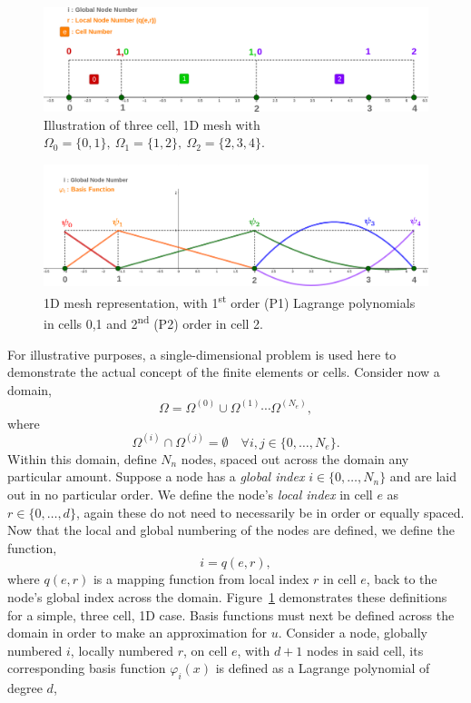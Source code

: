 \begin{figure}
	\centering
	\includegraphics[width=0.8\linewidth]{Figures/node_numbers}
	\caption{Illustration of three cell, 1D mesh with $\Omega_0 = \{0,1\},~\Omega_1 = \{1,2\},~\Omega_2 = \{2,3,4\}$.}
	\label{fig:cells}
\end{figure}
\begin{figure}
	\centering
	\includegraphics[width=0.8\linewidth]{Figures/basis_funcs}
	\caption{1D mesh representation, with 1\textsuperscript{st} order (P1) Lagrange polynomials in cells 0,1 and 2\textsuperscript{nd} (P2) order in cell 2.}
	\label{fig:1dbasis}
\end{figure}
For illustrative purposes, a single-dimensional problem is used here to demonstrate the actual concept of the finite elements or cells. Consider now a domain,
\begin{equation}
	\Omega = \Omega^{(0)}\cup\Omega^{(1)}\cdots\Omega^{(N_e)},
\end{equation}
where 
\begin{equation}
	\Omega^{(i)}\cap\Omega^{(j)} = \emptyset \quad \forall i,j \in \{0,\dots,N_e\}.
\end{equation}
Within this domain, define $N_n$ nodes, spaced out across the domain any particular amount. Suppose a node has a \textit{global index} $i \in \{0,\dots,N_n\}$ and are laid out in no particular order. We define the node's \textit{local index} in cell $e$ as $r \in \{0,\dots,d\}$, again these do not need to necessarily be in order or equally spaced. Now that the local and global numbering of the nodes are defined, we define the function,
\begin{equation}\label{dof}
	i = q(e,r),
\end{equation}
where $q(e,r)$ is a mapping function from local index $r$ in cell $e$, back to the node's global index across the domain. Figure~\ref{fig:cells} demonstrates these definitions for a simple, three cell, 1D case. Basis functions must next be defined across the domain in order to make an approximation for $u$. Consider a node, globally numbered $i$, locally numbered $r$, on cell $e$, with $d+1$ nodes in said cell, its corresponding basis function $\varphi_i(x)$ is defined as a Lagrange polynomial of degree $d$,
